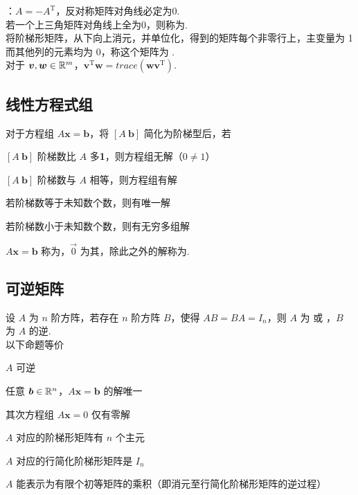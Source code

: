 \documentclass[./main.tex]{subfiles}
\begin{document}
：$A=-A^{\mathrm{T}}$，反对称矩阵对角线必定为0. \\

若一个上三角矩阵对角线上全为0，则称为. \\

将阶梯形矩阵，从下向上消元，并单位化，得到的矩阵每个非零行上，主变量为 1 而其他列的元素均为 0，称这个矩阵为 . \\

对于 $\bm{v},\bm{w}\in\mathbb{R}^{m}$，$\bm{v}^{\mathrm{T}}\bm{w} = trace(\bm{w}\bm{v}^{\mathrm{T}})$.

\subsection{线性方程式组}

对于方程组 $A\bm{x}=\bm{b}$，将 $[A\ \bm{b}]$ 简化为阶梯型后，若

\begin{enumerate*}
    \item $[A\ \bm{b}]$ 阶梯数比 $A$ 多\textbf{1}，则方程组无解（$0\neq 1$）
    \item $[A\ \bm{b}]$ 阶梯数与 $A$ 相等，则方程组有解
    \begin{enumerate*}
        \item 若阶梯数等于未知数个数，则有唯一解
        \item 若阶梯数小于未知数个数，则有无穷多组解
    \end{enumerate*}
\end{enumerate*}

$A\bm{x}=\bm{b}$ 称为，$\vec{0}$ 为其，除此之外的解称为.

\subsection{可逆矩阵}

设 $A$ 为 $n$ 阶方阵，若存在 $n$ 阶方阵 $B$，使得 $AB=BA=I_n$，则 $A$ 为  或 ，$B$ 为 $A$ 的逆. \\

以下命题等价
\begin{enumerate*}
    \item $A$ 可逆
    \item 任意 $\bm{b}\in\mathbb{R}^{n}$，$A\bm{x}=\bm{b}$ 的解唯一
    \item 其次方程组 $A\bm{x}=0$ 仅有零解
    \item $A$ 对应的阶梯形矩阵有 $n$ 个主元
    \item $A$ 对应的行简化阶梯形矩阵是 $I_n$
    \item $A$ 能表示为有限个初等矩阵的乘积（即消元至行简化阶梯形矩阵的逆过程）
\end{enumerate*}
\end{document}
